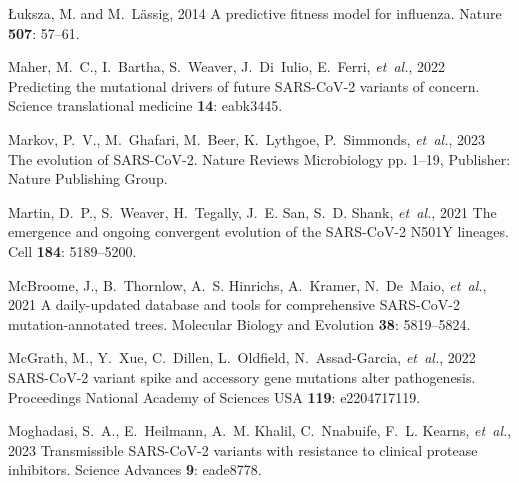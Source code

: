 \documentclass[9pt,twocolumn,twoside]{gsajnl_modified}
\begin{document}
{\begin{thebibliography}{76}
{{\L}uksza, M. {\rm and} M.~L{\"a}ssig}, 2014 A predictive fitness model for
  influenza. Nature {\bf 507}: 57--61.

{Maher, M.~C., I.~Bartha, S.~Weaver, J.~Di~Iulio, E.~Ferri, {\em et~al.\/}},
  2022 Predicting the mutational drivers of future {SARS-CoV-2} variants of
  concern. Science translational medicine {\bf 14}: eabk3445.

{Markov, P.~V., M.~Ghafari, M.~Beer, K.~Lythgoe, P.~Simmonds, {\em et~al.\/}},
  2023 The evolution of {SARS}-{CoV}-2. Nature Reviews Microbiology pp. 1--19,
  Publisher: Nature Publishing Group.

{Martin, D.~P., S.~Weaver, H.~Tegally, J.~E. San, S.~D. Shank, {\em et~al.\/}},
  2021 {The emergence and ongoing convergent evolution of the SARS-CoV-2 N501Y
  lineages}. Cell {\bf 184}: 5189--5200.

{McBroome, J., B.~Thornlow, A.~S. Hinrichs, A.~Kramer, N.~De~Maio, {\em
  et~al.\/}}, 2021 A daily-updated database and tools for comprehensive
  {SARS-CoV-2} mutation-annotated trees. Molecular Biology and Evolution {\bf
  38}: 5819--5824.

{McGrath, M., Y.~Xue, C.~Dillen, L.~Oldfield, N.~Assad-Garcia, {\em et~al.\/}},
  2022 {SARS-CoV-2} variant spike and accessory gene mutations alter
  pathogenesis. Proceedings National Academy of Sciences USA {\bf 119}:
  e2204717119.

{Moghadasi, S.~A., E.~Heilmann, A.~M. Khalil, C.~Nnabuife, F.~L. Kearns, {\em
  et~al.\/}}, 2023 Transmissible {SARS-CoV-2} variants with resistance to
  clinical protease inhibitors. Science Advances {\bf 9}: eade8778.


\end{thebibliography}}
\end{document}
